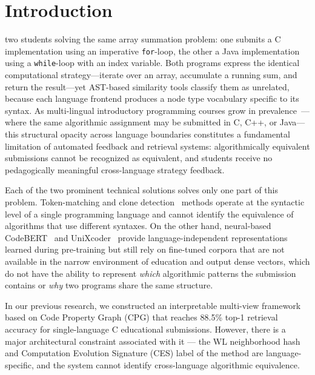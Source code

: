 \section{Introduction}
\label{sec:introduction}

 two students solving the same array summation problem: one submits a C implementation using an imperative \texttt{for}-loop, the other a Java implementation using a \texttt{while}-loop with an index variable. Both programs express the identical computational strategy---iterate over an array, accumulate a running sum, and return the result---yet AST-based similarity tools classify them as unrelated, because each language frontend produces a node type vocabulary specific to its syntax. As multi-lingual introductory programming courses grow in prevalence~\cite{ref_luxton2018}---where the same algorithmic assignment may be submitted in C, C++, or Java---this structural opacity across language boundaries constitutes a fundamental limitation of automated feedback and retrieval systems: algorithmically equivalent submissions cannot be recognized as equivalent, and students receive no pedagogically meaningful cross-language strategy feedback.

Each of the two prominent technical solutions solves only one part of this problem. Token-matching and clone detection~\cite{ref_baker1995} methods operate at the syntactic level of a single programming language and cannot identify the equivalence of algorithms that use different syntaxes. On the other hand, neural-based CodeBERT~\cite{ref_codebert} and UniXcoder~\cite{ref_unixcoder} provide language-independent representations learned during pre-training but still rely on fine-tuned corpora that are not available in the narrow environment of education and output dense vectors, which do not have the ability to represent \textit{which} algorithmic patterns the submission contains or \textit{why} two programs share the same structure.

In our previous research, we constructed an interpretable multi-view framework based on Code Property Graph (CPG) that reaches 88.5\% top-1 retrieval accuracy for single-language C educational submissions. However, there is a major architectural constraint associated with it --- the WL neighborhood hash and Computation Evolution Signature (CES) label of the method are language-specific, and the system cannot identify cross-language algorithmic equivalence.

